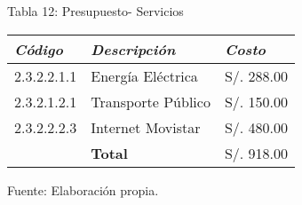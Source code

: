 \newpage

            \begin{table}[h!]
                \centering
                { Tabla 12: Presupuesto- Servicios}\par
                \begin{tabular}{|p{2cm}|p{4cm}|p{2.2cm}|} \hline
                    
                
                \textit{{\bf{Código}}} &
                \textit{{\bf{Descripción}}} &
                \textit{{\bf{Costo}}}
                \\ \hline

                2.3.2.2.1.1 &
                Energía Eléctrica &
                S/. 288.00
                \\ \hline

                2.3.2.1.2.1 &
                Transporte Público &
                S/. 150.00
                \\ \hline

                2.3.2.2.2.3 &
                Internet Movistar &
                S/. 480.00
                \\ \hline

                &
                \bf{Total} &
                S/. 918.00
                \\ \hline

                \end{tabular}
                \begin{center}
                    \vskip -0.2cm
                    {\small{Fuente: Elaboración propia.}}
                \end{center}
            \end{table}
